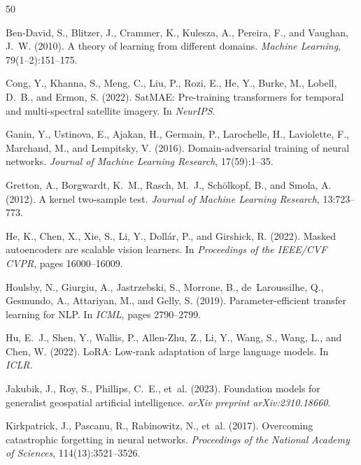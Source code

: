 \documentclass[11pt,a4paper]{report}
\begin{document}
\small
{}

\begin{thebibliography}{50}
\setlength{\itemsep}{1pt}

Ben-David, S., Blitzer, J., Crammer, K., Kulesza, A., Pereira, F., and Vaughan, J.~W. (2010).
A theory of learning from different domains.
\emph{Machine Learning}, 79(1--2):151--175.

Cong, Y., Khanna, S., Meng, C., Liu, P., Rozi, E., He, Y., Burke, M., Lobell, D.~B., and Ermon, S. (2022).
SatMAE: Pre-training transformers for temporal and multi-spectral satellite imagery.
In \emph{NeurIPS}.

Ganin, Y., Ustinova, E., Ajakan, H., Germain, P., Larochelle, H., Laviolette, F., Marchand, M., and Lempitsky, V. (2016).
Domain-adversarial training of neural networks.
\emph{Journal of Machine Learning Research}, 17(59):1--35.

Gretton, A., Borgwardt, K.~M., Rasch, M.~J., Sch{\"o}lkopf, B., and Smola, A. (2012).
A kernel two-sample test.
\emph{Journal of Machine Learning Research}, 13:723--773.

He, K., Chen, X., Xie, S., Li, Y., Doll{\'a}r, P., and Girshick, R. (2022).
Masked autoencoders are scalable vision learners.
In \emph{Proceedings of the IEEE/CVF CVPR}, pages 16000--16009.

Houlsby, N., Giurgiu, A., Jastrzebski, S., Morrone, B., de~Laroussilhe, Q., Gesmundo, A., Attariyan, M., and Gelly, S. (2019).
Parameter-efficient transfer learning for NLP.
In \emph{ICML}, pages 2790--2799.

Hu, E.~J., Shen, Y., Wallis, P., Allen-Zhu, Z., Li, Y., Wang, S., Wang, L., and Chen, W. (2022).
LoRA: Low-rank adaptation of large language models.
In \emph{ICLR}.

Jakubik, J., Roy, S., Phillips, C.~E., et~al. (2023).
Foundation models for generalist geospatial artificial intelligence.
\emph{arXiv preprint arXiv:2310.18660}.

Kirkpatrick, J., Pascanu, R., Rabinowitz, N., et~al. (2017).
Overcoming catastrophic forgetting in neural networks.
\emph{Proceedings of the National Academy of Sciences}, 114(13):3521--3526.


\end{thebibliography}
\end{document}
